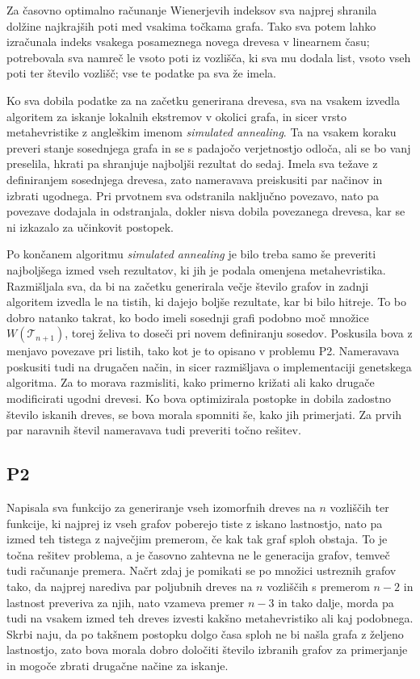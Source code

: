 \documentclass[a4paper, 12 pt]{article}
\begin{document}
Za časovno optimalno računanje Wienerjevih indeksov sva najprej shranila dolžine najkrajših poti med vsakima točkama grafa. Tako sva potem lahko izračunala indeks vsakega posameznega novega drevesa v linearnem času; potrebovala sva namreč le vsoto poti iz vozlišča, ki sva mu dodala list, vsoto vseh poti ter število vozlišč; vse te podatke pa sva že imela. \newline

 Ko sva dobila podatke za na začetku generirana drevesa, sva na vsakem izvedla algoritem za iskanje lokalnih ekstremov v okolici grafa, in sicer vrsto metahevristike z angleškim imenom \textit{simulated annealing}. Ta na vsakem koraku preveri stanje sosednjega grafa in se s padajočo verjetnostjo odloča, ali se bo vanj preselila, hkrati pa shranjuje najboljši rezultat do sedaj. Imela sva težave z definiranjem sosednjega drevesa, zato nameravava preiskusiti par načinov in izbrati ugodnega. Pri prvotnem sva odstranila naključno povezavo, nato pa povezave dodajala in odstranjala, dokler nisva dobila povezanega drevesa, kar se ni izkazalo za učinkovit postopek. \newline

Po končanem algoritmu \textit{simulated annealing} je bilo treba samo še preveriti najboljšega izmed vseh rezultatov, ki jih je podala omenjena metahevristika. Razmišljala sva, da bi na začetku generirala večje število grafov in zadnji algoritem izvedla le na tistih, ki dajejo boljše rezultate, kar bi bilo hitreje. To bo dobro natanko takrat, ko bodo imeli sosednji grafi podobno moč množice $W(\mathscr{T}_{n+1})$, torej želiva to doseči pri novem definiranju sosedov. Poskusila bova z menjavo povezave pri listih, tako kot je to opisano v problemu P2. Nameravava poskusiti tudi na drugačen način, in sicer razmišljava o implementaciji genetskega algoritma. Za to morava razmisliti, kako primerno križati ali kako drugače modificirati ugodni drevesi. Ko bova optimizirala postopke in dobila zadostno število iskanih dreves, se bova morala spomniti še, kako jih primerjati. Za prvih par naravnih števil nameravava tudi preveriti točno rešitev.

\subsection{P2}
Napisala sva funkcijo za generiranje vseh izomorfnih dreves na $n$ vozliščih ter funkcije, ki najprej iz vseh grafov poberejo tiste z iskano lastnostjo, nato pa izmed teh tistega z največjim premerom, če kak tak graf sploh obstaja. To je točna rešitev problema, a je časovno zahtevna ne le generacija grafov, temveč tudi računanje premera. Načrt zdaj je pomikati se po množici ustreznih grafov tako, da najprej narediva par poljubnih dreves na $n$ vozliščih s premerom $n - 2$ in lastnost preveriva za njih, nato vzameva premer $n - 3$ in tako dalje, morda pa tudi na vsakem izmed teh dreves izvesti kakšno metahevristiko ali kaj podobnega. Skrbi naju, da po takšnem postopku dolgo časa sploh ne bi našla grafa z željeno lastnostjo, zato bova morala dobro določiti število izbranih grafov za primerjanje in mogoče zbrati drugačne načine za iskanje.
\end{document}
